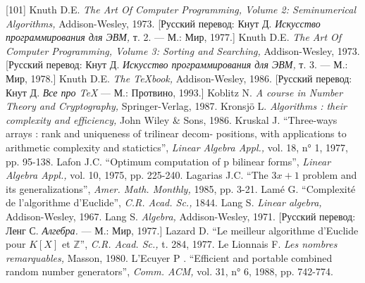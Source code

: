 \documentclass{../../template/mai_book}
\begin{document}
[101] Knuth D.E. {\itshape The Art Of Computer Programming, Volume 2: Seminumerical Algorithms,} Addison-Wesley, 1973. [Русский перевод: Кнут Д.
{\itshape Искусство программирования для ЭВМ,} т. 2. — М.: Мир, 1977.] \newline
[102] Knuth D.E. {\itshape The Art Of Computer Programming, Volume 3: Sorting and Searching,} Addison-Wesley, 1973. [Русский перевод: Кнут Д. {\itshape Искусство программирования для ЭВМ,} т. 3. — М.: Мир, 1978.] \newline
[103] Knuth D.E. {\itshape The \TeX book,} Addison-Wesley, 1986. [Русский перевод: Кнут Д. {\itshape Все про \TeX} — М.: Протвино, 1993.] \newline
[104] Koblitz N. {\itshape A course in Number Theory and Cryptography,} Springer-Verlag, 1987. \newline
[105] Kronsj\"o L. {\itshape Algorithms : their complexity and efficiency,} John Wiley \& Sons, 1986. \newline
[106] Kruskal J. “Three-ways arrays : rank and uniqueness of trilinear decom- \newline positions, with applications to arithmetic complexity and statictics”, {\itshape Linear Algebra Appl.,} vol. 18, n° 1, 1977, pp. 95-138. \newline
[107] Lafon J.C. “Optimum computation of p bilinear forms”, {\itshape Linear Algebra Appl.,} vol. 10, 1975, pp. 225-240. \newline
[108] Lagarias J.C. “The $3x + 1$ problem and its generalizations”, {\itshape Amer. Math. Monthly,} 1985, pp. 3-21.  \newline
[109] Lam\'{e} G. “Complexit\'{e} de l’algorithme d’Euclide”, {\itshape C.R. Acad. Sc.,} 1844.  \newline
[110] Lang S. {\itshape Linear algebra,} Addison-Wesley, 1967.  \newline
[111] Lang S. {\itshape Algebra,} Addison-Wesley, 1971. [Русский перевод: Ленг С. {\itshape Алгебра.} — М.: Мир, 1977.]  \newline
[112] Lazard D. “Le meilleur algorithme d’Euclide pour $K[X]$ et $\mathds{Z}$”, {\itshape C.R. Acad. Sc.,} t. 284, 1977. \newline
[113] Le Lionnais F. {\itshape Les nombres remarquables,} Masson, 1980. \newline
[114] L’Ecuyer P . “Efficient and portable combined random number generators”, {\itshape Comm. ACM,} vol. 31, n° 6, 1988, pp. 742-774. \newline
\newpage
\noindent
\end{document}
